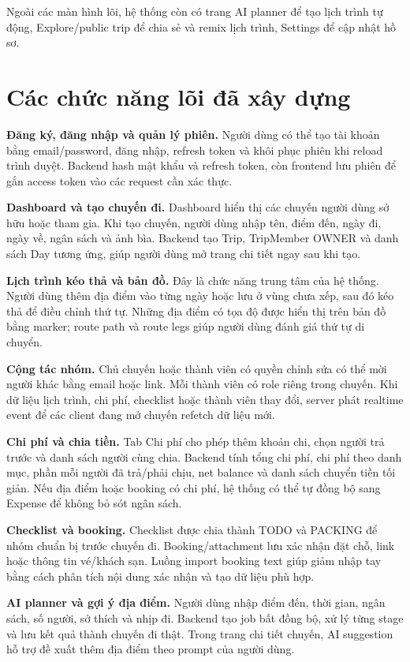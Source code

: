 \documentclass[a4paper]{report}
\begin{document}
Ngoài các màn hình lõi, hệ thống còn có trang AI planner để tạo lịch trình tự động, Explore/public trip để chia sẻ và remix lịch trình, Settings để cập nhật hồ sơ.

\section{Các chức năng lõi đã xây dựng}

\textbf{Đăng ký, đăng nhập và quản lý phiên.} Người dùng có thể tạo tài khoản bằng email/password, đăng nhập, refresh token và khôi phục phiên khi reload trình duyệt. Backend hash mật khẩu và refresh token, còn frontend lưu phiên để gắn access token vào các request cần xác thực.

\textbf{Dashboard và tạo chuyến đi.} Dashboard hiển thị các chuyến người dùng sở hữu hoặc tham gia. Khi tạo chuyến, người dùng nhập tên, điểm đến, ngày đi, ngày về, ngân sách và ảnh bìa. Backend tạo Trip, TripMember OWNER và danh sách Day tương ứng, giúp người dùng mở trang chi tiết ngay sau khi tạo.

\textbf{Lịch trình kéo thả và bản đồ.} Đây là chức năng trung tâm của hệ thống. Người dùng thêm địa điểm vào từng ngày hoặc lưu ở vùng chưa xếp, sau đó kéo thả để điều chỉnh thứ tự. Những địa điểm có tọa độ được hiển thị trên bản đồ bằng marker; route path và route legs giúp người dùng đánh giá thứ tự di chuyển.

\textbf{Cộng tác nhóm.} Chủ chuyến hoặc thành viên có quyền chỉnh sửa có thể mời người khác bằng email hoặc link. Mỗi thành viên có role riêng trong chuyến. Khi dữ liệu lịch trình, chi phí, checklist hoặc thành viên thay đổi, server phát realtime event để các client đang mở chuyến refetch dữ liệu mới.

\textbf{Chi phí và chia tiền.} Tab Chi phí cho phép thêm khoản chi, chọn người trả trước và danh sách người cùng chia. Backend tính tổng chi phí, chi phí theo danh mục, phần mỗi người đã trả/phải chịu, net balance và danh sách chuyển tiền tối giản. Nếu địa điểm hoặc booking có chi phí, hệ thống có thể tự đồng bộ sang Expense để không bỏ sót ngân sách.

\textbf{Checklist và booking.} Checklist được chia thành TODO và PACKING để nhóm chuẩn bị trước chuyến đi. Booking/attachment lưu xác nhận đặt chỗ, link hoặc thông tin vé/khách sạn. Luồng import booking text giúp giảm nhập tay bằng cách phân tích nội dung xác nhận và tạo dữ liệu phù hợp.

\textbf{AI planner và gợi ý địa điểm.} Người dùng nhập điểm đến, thời gian, ngân sách, số người, sở thích và nhịp đi. Backend tạo job bất đồng bộ, xử lý từng stage và lưu kết quả thành chuyến đi thật. Trong trang chi tiết chuyến, AI suggestion hỗ trợ đề xuất thêm địa điểm theo prompt của người dùng.
\end{document}

